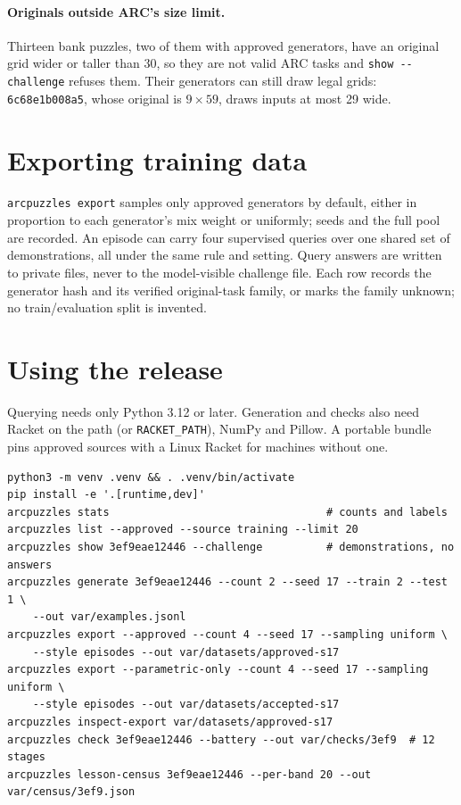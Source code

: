 \documentclass[11pt]{article}
\newcommand{\gen}[1]{\texttt{#1}}
\begin{document}
\paragraph{Originals outside ARC's size limit.} Thirteen bank puzzles, two of
them with approved generators, have an original grid wider or taller than 30, so
they are not valid ARC tasks and \texttt{show -{}-challenge} refuses them. Their
generators can still draw legal grids: \gen{6c68e1b008a5}, whose original is
$9\times59$, draws inputs at most 29 wide.

\section{Exporting training data}

\texttt{arcpuzzles export} samples only approved generators by default, either
in proportion to each generator's mix weight or uniformly; seeds and the full
pool are recorded. An episode can carry four supervised queries over one shared
set of demonstrations, all under the same rule and setting. Query answers are
written to private files, never to the model-visible challenge file. Each row
records the generator hash and its verified original-task family, or marks the
family unknown; no train/evaluation split is invented.

\section{Using the release}
\label{sec:use}

Querying needs only Python 3.12 or later. Generation and checks also need
Racket on the path (or \texttt{RACKET\_PATH}), NumPy and Pillow. A portable
bundle pins approved sources with a Linux Racket for machines without one.

\noindent\begin{minipage}{\linewidth}
\begin{lstlisting}
python3 -m venv .venv && . .venv/bin/activate
pip install -e '.[runtime,dev]'
arcpuzzles stats                                  # counts and labels
arcpuzzles list --approved --source training --limit 20
arcpuzzles show 3ef9eae12446 --challenge          # demonstrations, no answers
arcpuzzles generate 3ef9eae12446 --count 2 --seed 17 --train 2 --test 1 \
    --out var/examples.jsonl
arcpuzzles export --approved --count 4 --seed 17 --sampling uniform \
    --style episodes --out var/datasets/approved-s17
arcpuzzles export --parametric-only --count 4 --seed 17 --sampling uniform \
    --style episodes --out var/datasets/accepted-s17
arcpuzzles inspect-export var/datasets/approved-s17
arcpuzzles check 3ef9eae12446 --battery --out var/checks/3ef9  # 12 stages
arcpuzzles lesson-census 3ef9eae12446 --per-band 20 --out var/census/3ef9.json
\end{lstlisting}
\end{minipage}
\end{document}
